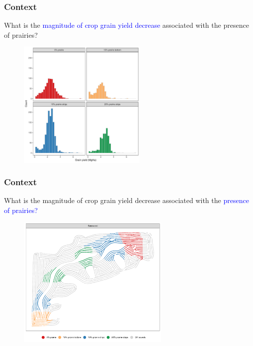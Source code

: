 \documentclass{beamer}
\begin{document}
\begin{frame}
  \frametitle{Context}
  
  \begin{center}
    What is the \textcolor{blue}{magnitude of crop grain
        yield decrease} associated with the presence of prairies?
  \end{center}

  \begin{figure}
    \includegraphics[width=0.55\textwidth]{./figures/strips_hist.pdf}
  \end{figure}
    
\end{frame}

\begin{frame}
  \frametitle{Context}

  \begin{center}
    What is the magnitude of crop grain yield decrease
    associated with the \textcolor{blue}{presence of prairies?}  
  \end{center}

  \begin{figure}
    \includegraphics[width=0.65\textwidth]{./figures/strips_map.pdf}
  \end{figure}
    
\end{frame}
\end{document}
